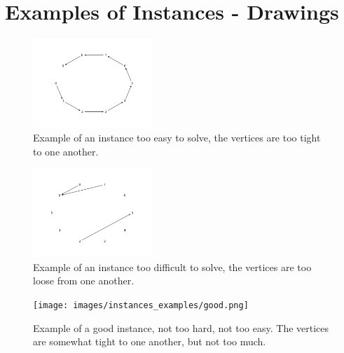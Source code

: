 \section{Examples of Instances - Drawings}

\begin{figure}[H]
    \centering
    \includegraphics[width=0.4\textwidth]{images/instances_examples/too_easy.png}
    \caption{Example of an instance too easy to solve, the vertices are too tight to one another.}
\end{figure}

\begin{figure}[H]
    \centering
    \includegraphics[width=0.4\textwidth]{images/instances_examples/too_difficult.png}
    \caption{Example of an instance too difficult to solve, the vertices are too loose from one another.}
\end{figure}

\begin{figure}[H]
    \centering
    \texttt{[image: images/instances\_examples/good.png]}
    \caption{Example of a good instance, not too hard, not too easy. The vertices are somewhat tight to one another, but not too much.}
\end{figure}
